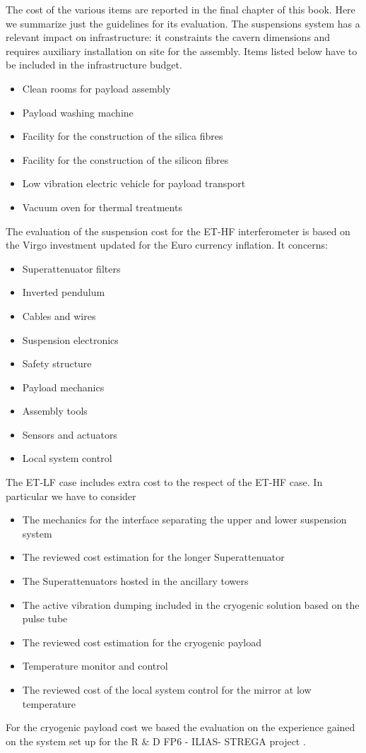 The cost of the various items are reported in the final chapter of this book. Here we summarize just the guidelines for its evaluation.
The suspensions system has a relevant impact on infrastructure: it constraints the cavern dimensions and  requires auxiliary installation on site for the assembly. Items listed below  have to be  included in the infrastructure budget.

\begin{itemize}
\item {Clean rooms for payload assembly}
\item{Payload washing machine}
\item{Facility for the construction of the silica fibres}
\item {Facility for the construction of the silicon fibres}
\item {Low vibration electric vehicle for payload transport}
\item{ Vacuum oven for thermal treatments}
\end{itemize}

 The evaluation of the suspension cost for the ET-HF interferometer  is based on the Virgo investment updated for the Euro currency  inflation. It concerns:

\begin{itemize}

\item {Superattenuator filters}
\item{Inverted pendulum}
\item{Cables and wires}
\item{Suspension electronics}
\item{Safety structure}
\item {Payload mechanics}
\item {Assembly tools}
\item{Sensors and actuators}
\item{Local system control}
\end{itemize}

The ET-LF case includes extra cost to the respect of the ET-HF case. In particular we have to consider
  

\begin{itemize}
\item{ The mechanics for  the interface separating the upper and lower suspension system}
\item {The reviewed cost estimation for the longer Superattenuator}
\item { The Superattenuators hosted in the ancillary towers}
\item {The active vibration dumping included in the cryogenic solution based on the pulse tube }
\item {The reviewed cost estimation for the cryogenic payload}
\item{Temperature monitor and control}
\item{ The reviewed cost of the local system control for the mirror at low temperature}
\end{itemize}

For the cryogenic payload cost we based the evaluation on the experience gained on  the system  set up for the R \& D FP6 - ILIAS- STREGA  project \cite{cryo_payload}.
